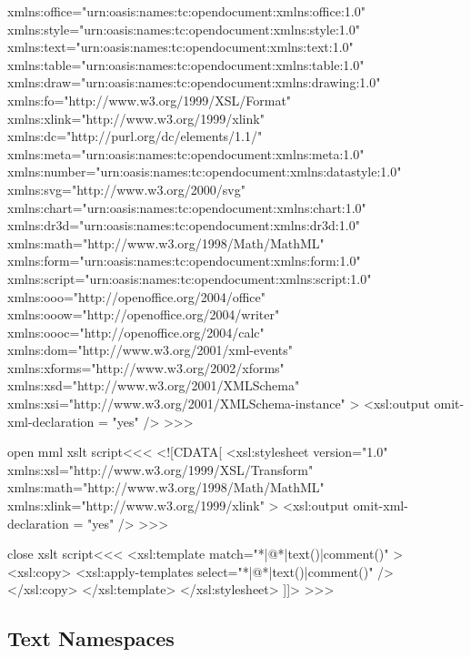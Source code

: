\documentclass{article}
\begin{document}
      xmlns:office="urn:oasis:names:tc:opendocument:xmlns:office:1.0"   
      xmlns:style="urn:oasis:names:tc:opendocument:xmlns:style:1.0"   
      xmlns:text="urn:oasis:names:tc:opendocument:xmlns:text:1.0"   
      xmlns:table="urn:oasis:names:tc:opendocument:xmlns:table:1.0"   
      xmlns:draw="urn:oasis:names:tc:opendocument:xmlns:drawing:1.0"   
      xmlns:fo="http://www.w3.org/1999/XSL/Format"   
      xmlns:xlink="http://www.w3.org/1999/xlink"   
      xmlns:dc="http://purl.org/dc/elements/1.1/"   
      xmlns:meta="urn:oasis:names:tc:opendocument:xmlns:meta:1.0"   
      xmlns:number="urn:oasis:names:tc:opendocument:xmlns:datastyle:1.0"  
      xmlns:svg="http://www.w3.org/2000/svg"   
      xmlns:chart="urn:oasis:names:tc:opendocument:xmlns:chart:1.0"   
      xmlns:dr3d="urn:oasis:names:tc:opendocument:xmlns:dr3d:1.0"   
      xmlns:math="http://www.w3.org/1998/Math/MathML"   
      xmlns:form="urn:oasis:names:tc:opendocument:xmlns:form:1.0"   
      xmlns:script="urn:oasis:names:tc:opendocument:xmlns:script:1.0"   
      xmlns:ooo="http://openoffice.org/2004/office"   
      xmlns:ooow="http://openoffice.org/2004/writer"   
      xmlns:oooc="http://openoffice.org/2004/calc"   
      xmlns:dom="http://www.w3.org/2001/xml-events"   
      xmlns:xforms="http://www.w3.org/2002/xforms"   
      xmlns:xsd="http://www.w3.org/2001/XMLSchema"   
      xmlns:xsi="http://www.w3.org/2001/XMLSchema-instance"
   >
      <xsl:output omit-xml-declaration = "yes" />
>>>



\<open mml xslt script\><<<
<![CDATA[ 
   <xsl:stylesheet version="1.0"
      xmlns:xsl="http://www.w3.org/1999/XSL/Transform"
      xmlns:math="http://www.w3.org/1998/Math/MathML"   
      xmlns:xlink="http://www.w3.org/1999/xlink"   
   >
      <xsl:output omit-xml-declaration = "yes" />
>>>


\<close xslt script\><<<
      <xsl:template match="*|@*|text()|comment()" >
        <xsl:copy>
          <xsl:apply-templates select="*|@*|text()|comment()" />
        </xsl:copy>
      </xsl:template>
   </xsl:stylesheet> 
]]>
>>>




\subsection{Text Namespaces}
\end{document}

